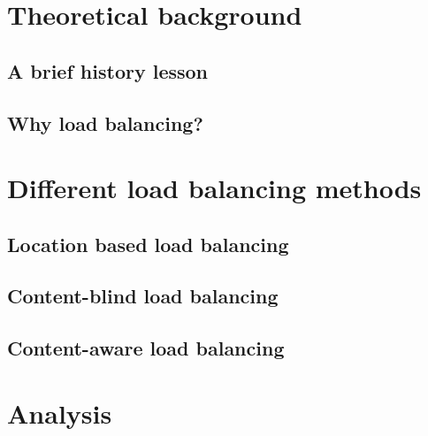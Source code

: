 \documentclass[english,12pt,a4paper,pdftex,elec,utf8]{aaltothesis}
\begin{document}
\section{Theoretical background}
\subsection{A brief history lesson}
\subsection{Why load balancing?}

\newpage

\section{Different load balancing methods}
\subsection{Location based load balancing}
\subsection{Content-blind load balancing}
\subsection{Content-aware load balancing}
\newpage



\section{Analysis}
\clearpage

\nocite{*}


\end{document}
